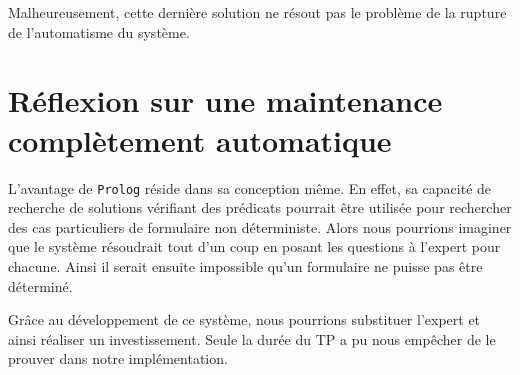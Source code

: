 Malheureusement, cette dernière solution ne résout pas le problème de la rupture de l'automatisme du système.



\section{Réflexion sur une maintenance complètement automatique}

L'avantage de \texttt{Prolog} réside dans sa conception même. En effet, sa capacité de recherche de solutions vérifiant des prédicats
pourrait être utilisée pour rechercher des cas particuliers de formulaire non déterministe. Alors nous pourrions imaginer que le
système résoudrait tout d'un coup en posant les questions à l'expert pour chacune. Ainsi il serait ensuite impossible qu'un
formulaire ne puisse pas être déterminé.

Grâce au développement de ce système, nous pourrions substituer l'expert et ainsi réaliser un investissement. Seule la durée du TP a pu nous empêcher de le prouver dans notre
implémentation.

